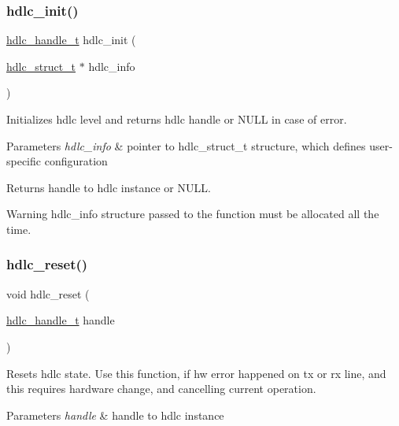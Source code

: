 \subsubsection{\texorpdfstring{hdlc\+\_\+init()}{hdlc\_init()}}
{\footnotesize\ttfamily \hyperlink{struct__hdlc__handle__t}{hdlc\+\_\+handle\+\_\+t} hdlc\+\_\+init (\begin{DoxyParamCaption}\item[{\hyperlink{group__HDLC__API_ga4537a8665b2abe023cb7fe40ea1bd024}{hdlc\+\_\+struct\+\_\+t} $\ast$}]{hdlc\+\_\+info }\end{DoxyParamCaption})}

Initializes hdlc level and returns hdlc handle or N\+U\+LL in case of error.


\begin{DoxyParams}{Parameters}
{\em hdlc\+\_\+info} & pointer to hdlc\+\_\+struct\+\_\+t structure, which defines user-\/specific configuration \\
\hline
\end{DoxyParams}
\begin{DoxyReturn}{Returns}
handle to hdlc instance or N\+U\+LL. 
\end{DoxyReturn}
\begin{DoxyWarning}{Warning}
hdlc\+\_\+info structure passed to the function must be allocated all the time. 
\end{DoxyWarning}
\mbox{\label{group__HDLC__API_ga532836280097de1c8881df8336f21075}} 
\subsubsection{\texorpdfstring{hdlc\+\_\+reset()}{hdlc\_reset()}}
{\footnotesize\ttfamily void hdlc\+\_\+reset (\begin{DoxyParamCaption}\item[{\hyperlink{struct__hdlc__handle__t}{hdlc\+\_\+handle\+\_\+t}}]{handle }\end{DoxyParamCaption})}

Resets hdlc state. Use this function, if hw error happened on tx or rx line, and this requires hardware change, and cancelling current operation.


\begin{DoxyParams}{Parameters}
{\em handle} & handle to hdlc instance \\
\hline
\end{DoxyParams}
\mbox{\label{group__HDLC__API_ga911a3f1cb32dd6cadd00223e0097642c}} 
